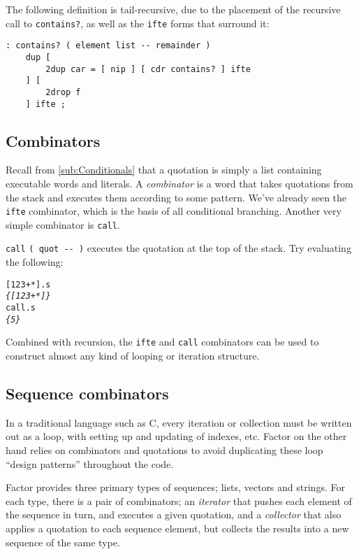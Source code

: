 \documentclass[english]{article}
\begin{document}
{The following definition is tail-recursive, due to the placement of the recursive call to \texttt{contains?}, as well as the \texttt{ifte} forms that surround it:

\begin{verbatim}
: contains? ( element list -- remainder )
    dup [
        2dup car = [ nip ] [ cdr contains? ] ifte
    ] [
        2drop f
    ] ifte ;
\end{verbatim}

\subsection{Combinators}

Recall from \ref{sub:Conditionals} that a quotation is simply a list containing executable words and literals. A \emph{combinator} is a word that takes quotations from the stack and executes them according to some pattern. We've already seen the \texttt{ifte} combinator, which is the basis of all conditional branching. Another very simple combinator is \texttt{call}.

\texttt{call} \texttt{( quot -{}- )} executes the quotation at the
top of the stack. Try evaluating the following:

\begin{alltt}
{[} 1 2 3 + {*} {]} .s
\emph{\{ {[} 1 2 3 + {*} {]} \}}
call .s
\emph{\{ 5 \}}
\end{alltt}

Combined with recursion, the \texttt{ifte} and \texttt{call} combinators can be used to construct almost any kind of looping or iteration structure.

\subsection{Sequence combinators}

In a traditional language such as C, every iteration or collection
must be written out as a loop, with setting up and updating of indexes,
etc. Factor on the other hand relies on combinators and quotations
to avoid duplicating these loop ``design patterns'' throughout
the code.

Factor provides three primary types of sequences; lists, vectors and strings. For each type, there is a pair of combinators; an \emph{iterator} that pushes each element of the sequence in turn, and executes a given quotation, and a \emph{collector} that also applies a quotation to each sequence element, but collects the results into a new sequence of the same type.

}
\end{document}
